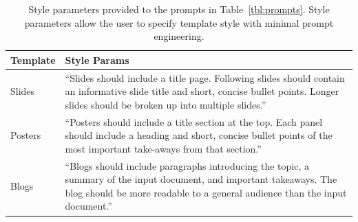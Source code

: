 \begin{table}[]
\small
\centering
\begin{tabular}{lp{}}
 Template & Style Params \\ \hline
Slides & ``Slides should include a title page. Following  slides should contain an informative slide  title and short, concise bullet points. Longer slides should be broken up into multiple slides.''
\\ \hdashline[0.5pt/3pt]
Posters & ``Posters should include a title section at the top. Each panel should include a heading and short, concise bullet points of the most important take-aways from that section.''
\\ \hdashline[0.5pt/3pt]
Blogs & ``Blogs should include paragraphs introducing the topic, a summary of the input document, and important takeaways. The blog should be more readable to a general audience than the input document.''
\end{tabular}
\caption[Style parameters.]{Style parameters provided to the prompts in Table~\ref{tbl:prompts}. Style parameters allow the user to specify template style with minimal prompt engineering.}
\label{tbl:style-params}
\end{table}